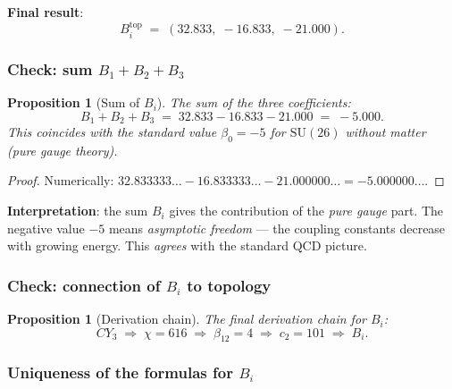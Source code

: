 \documentclass[11pt,a4paper]{article}
\newcommand{\SU}{\ensuremath{\mathrm{SU}}}
\newcommand{\CY}{\ensuremath{CY_3}}
\newtheorem{proposition}[theorem]{Proposition}
\theoremstyle{definition}
\begin{document}
\medskip\noindent
\textbf{Final result}:
\begin{equation}
    \boxed{
    B_i^{\text{top}} \;=\; (32.833,\; -16.833,\; -21.000).
    }
    \label{eq:bi-topology-values}
\end{equation}

\subsubsection{Check: sum \texorpdfstring{$B_1 + B_2 + B_3$}{B\_1 + B\_2 + B\_3}}

\begin{proposition}[Sum of $B_i$]
\label{prop:bi-sum}
The sum of the three coefficients:
\begin{equation}
    B_1 + B_2 + B_3 \;=\; 32.833 - 16.833 - 21.000 \;=\; -5.000.
    \label{eq:bi-sum}
\end{equation}
This coincides with the standard value $\beta_0 = -5$ for
$\SU(26)$ \emph{without matter} (pure gauge theory).
\end{proposition}

\begin{proof}
Numerically:
$32.833333\ldots - 16.833333\ldots - 21.000000\ldots = -5.000000\ldots$.
\end{proof}

\medskip\noindent
\textbf{Interpretation}: the sum $B_i$ gives the contribution of the
\emph{pure gauge} part. The negative value
$-5$ means \emph{asymptotic freedom}
--- the coupling constants decrease with growing energy. This \emph{agrees}
with the standard QCD picture.

\subsubsection{Check: connection of \texorpdfstring{$B_i$}{B\_i} to topology}

\begin{proposition}[Derivation chain]
\label{prop:bi-chain}
The final derivation chain for $B_i$:
\begin{equation}
    \boxed{
    \CY \;\Rightarrow\; \chi = 616
    \;\Rightarrow\; \beta_{12} = 4
    \;\Rightarrow\; c_2 = 101
    \;\Rightarrow\; B_i.
    }
    \label{eq:bi-chain}
\end{equation}
\end{proposition}

\subsubsection{Uniqueness of the formulas for \texorpdfstring{$B_i$}{B\_i}}
\end{document}
